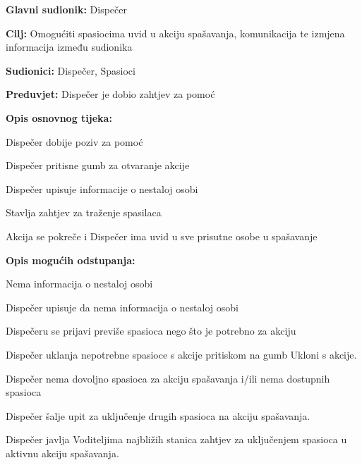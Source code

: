			\newpage
			\noindent {}
			\begin{packed_item}
				
				\item \textbf{Glavni sudionik: } Dispečer
				\item  \textbf{Cilj:} Omogućiti spasiocima uvid u akciju spašavanja, komunikacija te izmjena informacija između sudionika
				\item  \textbf{Sudionici:} Dispečer, Spasioci
				\item  \textbf{Preduvjet:} Dispečer je dobio zahtjev za pomoć
				\item  \textbf{Opis osnovnog tijeka:}
				
				\item[] \begin{packed_enum}
					
					\item Dispečer dobije poziv za pomoć
					\item Dispečer pritisne gumb za otvaranje akcije
					\item Dispečer upisuje informacije o nestaloj osobi
					\item Stavlja zahtjev za traženje spasilaca
					\item Akcija se pokreče i Dispečer ima uvid u sve prisutne osobe u spašavanje
				\end{packed_enum}
				
				\item  \textbf{Opis mogućih odstupanja:}
				
				\item[] \begin{packed_item}
					
					\item[3.a] Nema informacija o nestaloj osobi
					\item[] \begin{packed_enum}
						
						\item Dispečer upisuje da nema informacija o nestaloj osobi
						
					\end{packed_enum}
					\item[4.a] Dispečeru se prijavi previše spasioca nego što je potrebno za akciju
					\item[] \begin{packed_enum}
						\item Dispečer uklanja nepotrebne spasioce s akcije pritiskom na gumb Ukloni s akcije.
					\end{packed_enum}
					\item[4.b] Dispečer nema dovoljno spasioca za akciju spašavanja i/ili nema dostupnih spasioca
					\item[] \begin{packed_enum}
						\item Dispečer šalje upit za uključenje drugih spasioca na akciju spašavanja.
						\item Dispečer javlja Voditeljima najbližih stanica zahtjev za uključenjem spasioca u aktivnu akciju spašavanja.
					\end{packed_enum}
					

\end{packed_item}
\end{packed_item}
